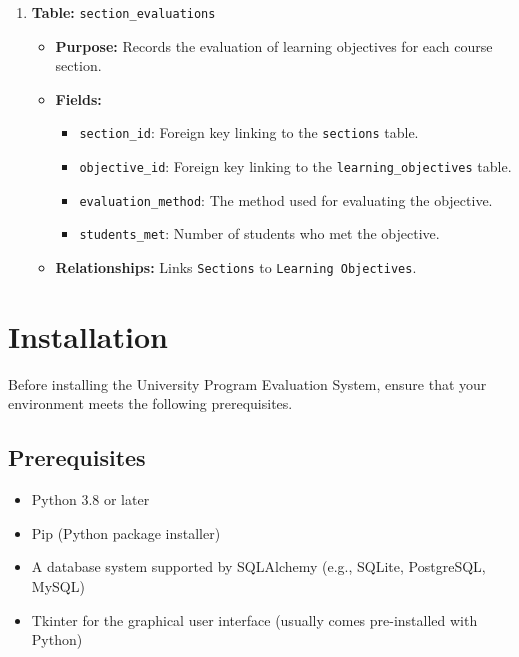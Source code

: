 \documentclass{article}
\begin{document}
\begin{enumerate}
		    \item \textbf{Table:} \texttt{section\_evaluations}
		    \begin{itemize}
		        \item \textbf{Purpose:} Records the evaluation of learning objectives for each course section.
		        \item \textbf{Fields:}
		        \begin{itemize}
		            \item \texttt{section\_id}: Foreign key linking to the \texttt{sections} table.
		            \item \texttt{objective\_id}: Foreign key linking to the \texttt{learning\_objectives} table.
		            \item \texttt{evaluation\_method}: The method used for evaluating the objective.
		            \item \texttt{students\_met}: Number of students who met the objective.
		        \end{itemize}
		        \item \textbf{Relationships:} Links \texttt{Sections} to \texttt{Learning Objectives}.
		    \end{itemize}
		\end{enumerate}

		\section*{Installation}
		Before installing the University Program Evaluation System, ensure that your environment meets the following prerequisites.

		\subsection{Prerequisites}
		\begin{itemize}
		    \item Python 3.8 or later
		    \item Pip (Python package installer)
		    \item A database system supported by SQLAlchemy (e.g., SQLite, PostgreSQL, MySQL)
		    \item Tkinter for the graphical user interface (usually comes pre-installed with Python)
		\end{itemize}
\end{document}
